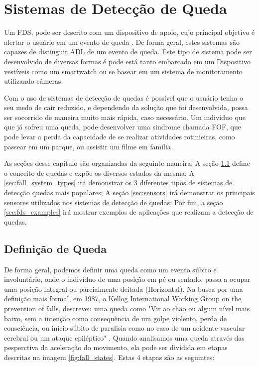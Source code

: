 \chapter{Sistemas de Detecção de Queda}
\label{cap:sistemasRecomendacao}

Um \ac{FDS}, pode ser descrito com um dispositivo de apoio, cujo principal objetivo é alertar o usuário em um evento de queda \citep{igual2013challenges}. De forma geral, estes sistemas são capazes de distinguir \ac{ADL}  de um evento de queda. Este tipo de sistema pode ser desenvolvido de diversas formas é pode está tanto embarcado em um Dispositivo vestíveis como um smartwatch ou se basear em um sistema de monitoramento utilizando câmeras. 

Com o uso de sistemas de detecção de quedas é possível que o usuário tenha o seu medo de cair reduzido, e dependendo da solução que foi desenvolvida, possa ser socorrido de maneira muito mais rápida, caso necessário. Um individuo que que já sofreu uma queda, pode desenvolver uma sindrome chamada \ac{FOF}, que pode levar a perda da capacidade de se realizar atividades rotinieiras, como passear em um parque, ou assistir um filme em família \citep{legters2002fear}.

As seções desse capítulo são organizadas da seguinte maneira: A seção \ref{sec:fall_definition} define o conceito de quedas e expõe os diversos estados da mesma; A \ref{sec:fall_system_types} irá demonstrar os 3 diferentes tipos de sistemas de detecção quedas mais populares; A seção \ref{sec:sensors} irá demonstrar os principais sensores utilizados nos sistemas de detecção de quedas; Por fim, a seção \ref{sec:fds_examples}  irá mostrar exemplos de aplicações que realizam a detecção de quedas. 



\section{Definição de Queda}
\label{sec:fall_definition}
De forma geral, podemos definir uma queda como um evento súbito e involuntário, onde o indivíduo de uma posição em pé ou sentado, passa a ocupar uma posição integral ou parcialmente deitada (Horizontal). Na busca por uma definição mais formal, em 1987, o Kellog International Working Group on the prevention of falls, descreveu uma queda como "Vir ao chão ou algum nível mais baixo, sem a intenção como consequência de um golpe violento, perda de consciência, ou início súbito de paralisia como no caso de um acidente vascular cerebral ou um ataque epiléptico"  \citep{igual2013challenges}. Quando analisamos uma queda através das pesperctiva da aceleração do movimento, ela pode ser dividida em etapas descritas na imagem \ref{fig:fall_states}. Estas 4 etapas são as seguintes:


